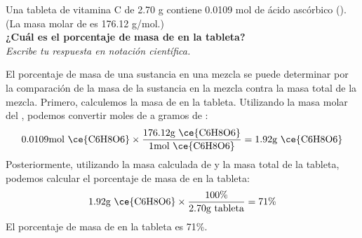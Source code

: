 Una tableta de vitamina C de 2.70 g contiene 0.0109 mol de ácido ascórbico (). (La masa molar de  es 176.12 g/mol.)\\
\textbf{¿Cuál es el porcentaje de masa de  en la tableta?}\\
\emph{Escribe tu respuesta en notación científica.}

\begin{solutionbox}{6.5cm}
    El porcentaje de masa de una sustancia en una mezcla se puede determinar por la comparación de la masa de la sustancia en la mezcla contra la masa total de la mezcla.
    Primero, calculemos la masa de  en la tableta. Utilizando la masa molar del , podemos convertir moles de  a gramos de :
    \[0.0109\text{mol \ce{C6H8O6}} \times \frac{176.12\text{g \ce{C6H8O6}}}{1\text{mol \ce{C6H8O6}}} = 1.92 \text{g \ce{C6H8O6}}\]
    Posteriormente, utilizando la masa calculada de  y la masa total de la tableta, podemos calcular el porcentaje de masa de  en la tableta:
    \[1.92\text{g \ce{C6H8O6}} \times \frac{100\%}{2.70\text{g tableta}} = 71\%\]
    El porcentaje de masa de  en la tableta es 71\%.
\end{solutionbox}